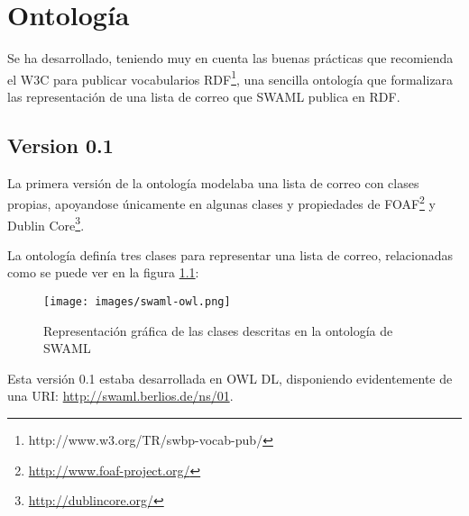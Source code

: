 
\chapter{Ontología}

Se ha desarrollado, teniendo muy en cuenta las buenas prácticas que recomienda 
el W3C para publicar vocabularios RDF\footnote{http://www.w3.org/TR/swbp-vocab-pub/}, 
una sencilla ontología que formalizara las representación de una lista de correo 
que SWAML publica en RDF. 

\section{Version 0.1}

La primera versión de la ontología modelaba una lista de correo con clases propias,
apoyandose únicamente en algunas clases y propiedades de 
FOAF\footnote{\url{http://www.foaf-project.org/}} y 
Dublin Core\footnote{\url{http://dublincore.org/}}.

La ontología definía tres clases para representar una lista de correo, relacionadas
como se puede ver en la figura \ref{fig:swamlOWL}:

\begin{figure}[ht]
	\centering
	\texttt{[image: images/swaml-owl.png]}
	\caption{Representación gráfica de las clases descritas en la ontología de SWAML}
	\label{fig:swamlOWL}
\end{figure}

Esta versión 0.1 estaba desarrollada en OWL DL, disponiendo evidentemente
de una URI: \url{http://swaml.berlios.de/ns/01}.

\newpage

